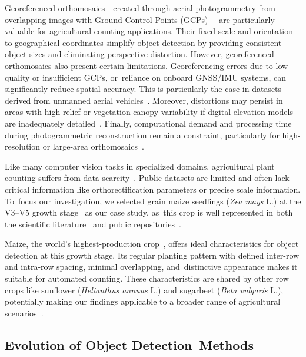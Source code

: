 \documentclass[12pt,a4paper,oneside]{report}
\begin{document}
Georeferenced orthomosaics—created through aerial photogrammetry from overlapping
images with Ground Control Points (GCPs) \cite{krausPhotogrammetryGeometryImages2011}—are 
particularly valuable for agricultural counting applications. Their fixed scale and
orientation to geographical coordinates simplify object detection by providing
consistent object sizes and eliminating perspective distortion.
However, georeferenced orthomosaics also present certain limitations. Georeferencing 
errors due to low-quality or insufficient GCPs, or~reliance on onboard GNSS/IMU 
systems, can significantly reduce spatial accuracy.
This is particularly the case in datasets derived from unmanned aerial vehicles~\cite{pugh_comparison_2021,dhonju_web_2023}. Moreover, 
distortions may persist in areas with high relief or vegetation canopy variability 
if digital elevation models are inadequately detailed~\cite{habib_automated_2016,de_petris_rpas-based_2020}. 
Finally, computational demand and processing time during photogrammetric reconstruction 
remain a constraint, particularly for high-resolution or large-area orthomosaics~\cite{zhang_georeferencing_2022}.

Like many computer vision tasks in specialized domains, agricultural plant counting
suffers from data scarcity~\cite{farjon_deep-learning-based_2023}. 
Public datasets are limited and often lack critical 
information like orthorectification parameters or precise scale information. To~focus
our investigation, we selected grain maize seedlings ({\em Zea mays} L.) at the V3--V5 
growth stage~\cite{meierBBCHSystemCoding2009} as our case study, as~this crop is well
represented in both the scientific literature~\cite{davidPlantDetectionCounting2021,
liuIntegrateNetDeepLearning2022} and public repositories~\cite{Maize_seedingDatasetOverview,
MaizeseedlingdetectionDatasetOverview}.

Maize, the world's highest-production crop~\cite{fao2024}, offers ideal characteristics
for object detection at this growth stage. Its regular planting pattern with defined
inter-row and intra-row spacing, minimal overlapping, and~distinctive appearance makes
it suitable for automated counting. These characteristics are shared by other row crops
like sunflower ({\em Helianthus annuus} L.) and sugarbeet ({\em Beta vulgaris} L.), potentially
making our findings applicable to a broader range of agricultural scenarios~\cite{torres-sanchez_early_2021}.

\subsection{Evolution of Object Detection~Methods}
\end{document}
